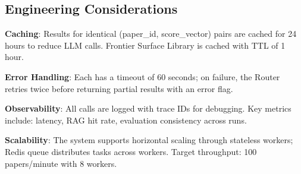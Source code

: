 \subsection{Engineering Considerations}

\textbf{Caching}: Results for identical (paper\_id, score\_vector) pairs are cached for 24 hours to reduce LLM calls. Frontier Surface Library is cached with TTL of 1 hour.

\textbf{Error Handling}: Each \subagent{} has a timeout of 60 seconds; on failure, the Router retries twice before returning partial results with an error flag.

\textbf{Observability}: All \subagent{} calls are logged with trace IDs for debugging. Key metrics include: \subagent{} latency, RAG hit rate, evaluation consistency across runs.

\textbf{Scalability}: The system supports horizontal scaling through stateless \subagent{} workers; Redis queue distributes tasks across workers. Target throughput: 100 papers/minute with 8 workers.
